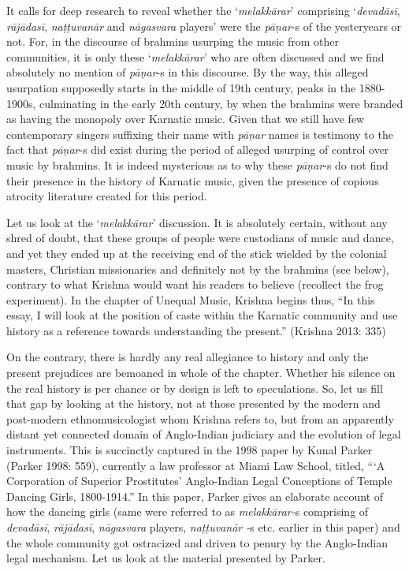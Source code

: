 {It calls for deep research to reveal whether the ‘\textit{melakkārar}’ comprising ‘\textit{devadāsī}, \textit{rājādasī}, \textit{naṭṭuvanār} and \textit{nāgasvara} players’ were the \textit{pāṇar}-s of the yesteryears or not. For, in the discourse of brahmins usurping the music from other communities, it is only these ‘\textit{melakkārar}’ who are often discussed and we find absolutely no mention of \textit{pāṇar}-s in this discourse. By the way, this alleged usurpation supposedly starts in the middle of 19th century, peaks in the 1880-1900s, culminating in the early 20th century, by when the brahmins were branded as having the monopoly over Karnatic music. Given that we still have few contemporary singers suffixing their name with \textit{pāṇar} names is testimony to the fact that \textit{pāṇar}-s did exist during the period of alleged usurping of control over music by brahmins. It is indeed mysterious as to why these \textit{pāṇar}-s do not find their presence in the history of Karnatic music, given the presence of copious atrocity literature created for this period.

Let us look at the ‘\textit{melakkārar}’ discussion. It is absolutely certain, without any shred of doubt, that these groups of people were custodians of music and dance, and yet they ended up at the receiving end of the stick wielded by the colonial masters, Christian missionaries and definitely not by the brahmins (see below), contrary to what Krishna would want his readers to believe (recollect the frog experiment). In the chapter of Unequal Music, Krishna begins thus, “In this essay, I will look at the position of caste within the Karnatic community and use history as a reference towards understanding the present.” (Krishna 2013: 335)

On the contrary, there is hardly any real allegiance to history and only the present prejudices are bemoaned in whole of the chapter. Whether his silence on the real history is per chance or by design is left to speculations. So, let us fill that gap by looking at the history, not at those presented by the modern and post-modern ethnomusicologist whom Krishna refers to, but from an apparently distant yet connected domain of Anglo-Indian judiciary and the evolution of legal instruments. This is succinctly captured in the 1998 paper by Kunal Parker (Parker 1998: 559), currently a law professor at Miami Law School, titled, “‘A Corporation of Superior Prostitutes’ Anglo-Indian Legal Conceptions of Temple Dancing Girls, 1800-1914.” In this paper, Parker gives an elaborate account of how the dancing girls (same were referred to as \textit{melakkārar-}s comprising of \textit{devadāsī}, \textit{rājādasī}, \textit{nāgasvara} players, \textit{naṭṭuvanār -}s etc. earlier in this paper) and the whole community got ostracized and driven to penury by the Anglo-Indian legal mechanism. Let us look at the material presented by Parker.

}
